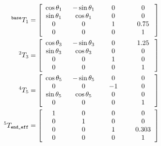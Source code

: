 \documentclass[a4paper]{article}
\newcommand\w[1]{\makebox[3.4em]{$#1$}}
\begin{document}
\small
\begin{minipage}[t]{0.45\textwidth}
	\begin{align*}
	^\texttt{base} T_1 &=
	\begin{bmatrix}
	\cos \theta_1 	& -\sin \theta_1 	& 0 	& 0\\
	\sin \theta_1	& \cos \theta_1		& 0		& 0\\
	0				& 0					& 1		& 0.75\\
	\w0				& \w0				& \w0	& \w1\\
	\end{bmatrix}\\
	^2 T_3 &=
	\begin{bmatrix}
	\cos \theta_3 	& -\sin \theta_3 	& 0 	& 1.25\\
	\sin \theta_3	& \cos \theta_3		& 0		& 0\\
	0				& 0					& 1		& 0\\
	\w0				& \w0				& \w0	& \w1
	\end{bmatrix}\\
	^4 T_5 &=
	\begin{bmatrix}
	\cos \theta_5	& -\sin \theta_5	& 0		& 0\\
	0				& 0					& -1	& 0\\
	\sin \theta_5	& \cos \theta_5		& 0		& 0\\
	\w0				& \w0				& \w0	& \w1
	\end{bmatrix}\\
	^5 T_\texttt{end\_eff} &=
	\begin{bmatrix}
	1				& 0					& 0		& 0\\
	0				& 1					& 0		& 0\\
	0				& 0					& \w1		& 0.303\\
	\w0				& \w0				& 0		& \w1
	\end{bmatrix}
	\end{align*}
\end{minipage}
\hspace{0.2cm}
\end{document}
